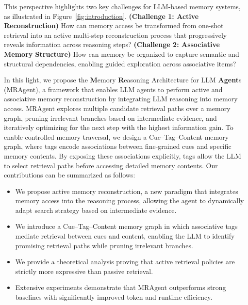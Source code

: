 This perspective highlights two key challenges for LLM-based memory systems, as illustrated in Figure~\ref{fig:introduction}.
\textbf{(Challenge 1: Active Reconstruction)} How can memory access be transformed from one-shot retrieval into an active multi-step reconstruction process that progressively reveals information across reasoning steps? \textbf{(Challenge 2: Associative Memory Structure)} How can memory be organized to capture semantic and structural dependencies, enabling guided exploration across associative items? 


In this light, we propose the \textbf{M}emory \textbf{R}easoning Architecture for LLM \textbf{Agent}s (MRAgent), a framework that enables LLM agents to perform active and associative memory reconstruction by integrating LLM reasoning into memory access.
MRAgent explores multiple candidate retrieval paths over a memory graph, pruning irrelevant branches based on intermediate evidence, and iteratively optimizing for the next step with the highest information gain.
To enable controlled memory traversal, we design a Cue–Tag–Content memory graph, where tags encode associations between fine-grained cues and specific memory contents. By exposing these associations explicitly, tags allow the LLM to select retrieval paths before accessing detailed memory contents.
Our contributions can be summarized as follows:
\begin{itemize}
    \item We propose active memory reconstruction, a new paradigm that integrates memory access into the reasoning process, allowing the agent to dynamically adapt  search strategy based on intermediate evidence.
    \item We introduce a Cue–Tag–Content memory graph in which associative tags mediate retrieval between cues and content, enabling the LLM to identify promising retrieval paths while pruning irrelevant branches.
    \item We provide a theoretical analysis proving that active retrieval policies are strictly more expressive than passive retrieval.
    \item Extensive experiments demonstrate that MRAgent outperforms strong baselines with significantly improved token and runtime efficiency.
\end{itemize}
